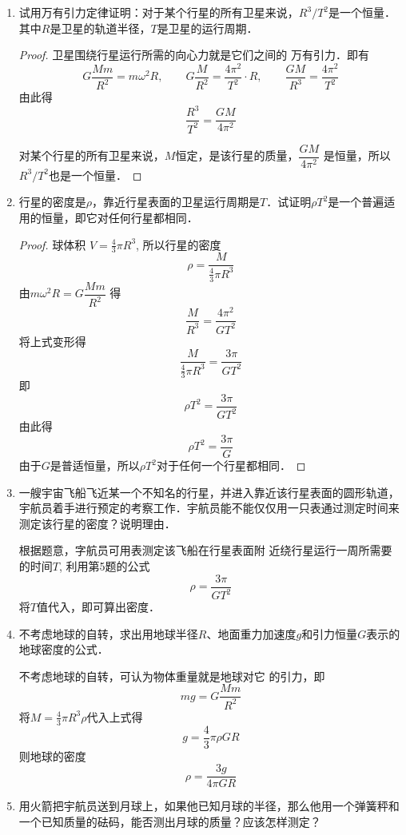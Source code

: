 \begin{enumerate}
	\item 试用万有引力定律证明：对于某个行星的所有卫星来说，$R^3/T^2$是一个恒量．其中$R$是卫星的轨道半径，$T$是卫星的运行周期．

	\begin{proof}
	卫星围绕行星运行所需的向心力就是它们之间的
万有引力．即有
\[G\frac{Mm}{R^2}=m\omega^2 R,\qquad G\frac{M}{R^2}=\frac{4\pi^2}{T^2}\cdot R,\qquad \frac{GM}{R^3}=\frac{4\pi^2}{T^2}\]
由此得
\[\frac{R^3}{T^2}=\frac{GM}{4\pi^2}\]

对某个行星的所有卫星来说，$M$恒定，是该行星的质量，$\dfrac{GM}{4\pi^2}$
是恒量，所以$R^3/T^2$也是一个恒量．
	\end{proof}
	
	\item 行星的密度是$\rho$，靠近行星表面的卫星运行周期是$T$．试证明$\rho T^2$是一个普遍适用的恒量，即它对任何行星都相同．

	\begin{proof}
球体积
$V=\frac{4}{3}\pi R^3$, 所以行星的密度
\[\rho=\frac{M}{\frac{4}{3}\pi R^3}\]
由$m\omega^2 R=G\dfrac{Mm}{R^2}$
得
\[\frac{M}{R^3}=\frac{4\pi^2}{GT^2}\]
将上式变形得
\[\frac{M}{\frac{4}{3}\pi R^3}=\frac{3\pi}{GT^2}\]
即
\[\rho T^2=\frac{3\pi}{GT^2}\]
由此得
\[\rho T^2=\frac{3\pi}{G}\]
由于$G$是普适恒量，所以$\rho T^2$对于任何一个行星都相同．
	\end{proof}
	
	\item 一艘宇宙飞船飞近某一个不知名的行星，并进入靠近该行星表面的圆形轨道，宇航员着手进行预定的考察工作．宇航员能不能仅仅用一只表通过测定时间来测定该行星的密度？说明理由．

	\begin{solution}
		根据题意，字航员可用表测定该飞船在行星表面附
		近绕行星运行一周所需要的时间$T$, 利用第5题的公式
		\[\rho=\frac{3\pi}{GT^2}\]
		将$T$值代入，即可算出密度．
	\end{solution}
	
	\item 不考虑地球的自转，求出用地球半径$R$、地面重力加速度$g$和引力恒量$G$表示的地球密度的公式．

	\begin{solution}
不考虑地球的自转，可认为物体重量就是地球对它
的引力，即
\[mg=G\frac{Mm}{R^2}\]
将$M=\frac{4}{3}\pi R^3\rho$代入上式得
\[g=\frac{4}{3}\pi\rho GR\]
则地球的密度
\[\rho=\frac{3g}{4\pi GR}\]
	\end{solution}
	
	\item 用火箭把宇航员送到月球上，如果他已知月球的半径，那么他用一个弹簧秤和一个已知质量的砝码，能否测出月球的质量？应该怎样测定？	


\end{enumerate}
